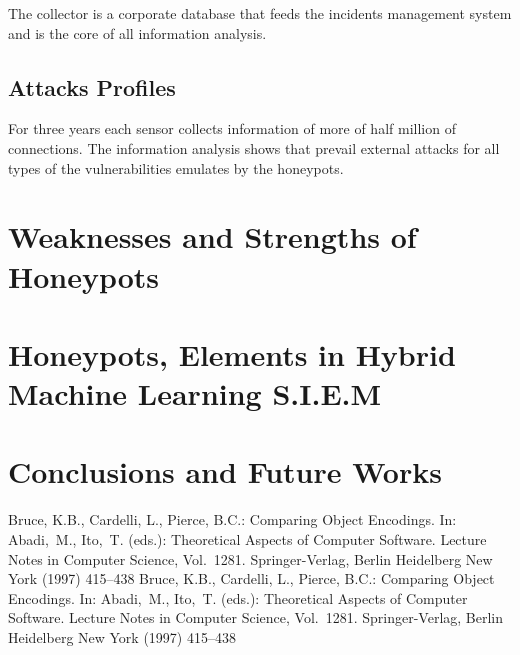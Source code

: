 \documentclass[a4paper]{llncs}
\begin{document}
The collector is a corporate database that feeds the incidents management system and is the core of all information analysis.


\subsection{Attacks Profiles}

For three years each sensor collects information of more of half million of connections. The information analysis shows that prevail external attacks for all types of the vulnerabilities emulates by the honeypots.


\section{Weaknesses and Strengths of Honeypots}

\section{Honeypots, Elements in Hybrid Machine Learning S.I.E.M}

\section{Conclusions and Future Works}

\begin{thebibliography}{2}
%
Bruce, K.B., Cardelli, L., Pierce, B.C.:
Comparing Object Encodings.
In: Abadi,~M., Ito,~T. (eds.):
Theoretical Aspects of Computer Software.
Lecture Notes in Computer Science, Vol.~1281.
Springer-Verlag, Berlin Heidelberg New York (1997) 415--438
%
Bruce, K.B., Cardelli, L., Pierce, B.C.:
Comparing Object Encodings.
In: Abadi,~M., Ito,~T. (eds.):
Theoretical Aspects of Computer Software.
Lecture Notes in Computer Science, Vol.~1281.
Springer-Verlag, Berlin Heidelberg New York (1997) 415--438
%
\end{thebibliography}
\end{document}
